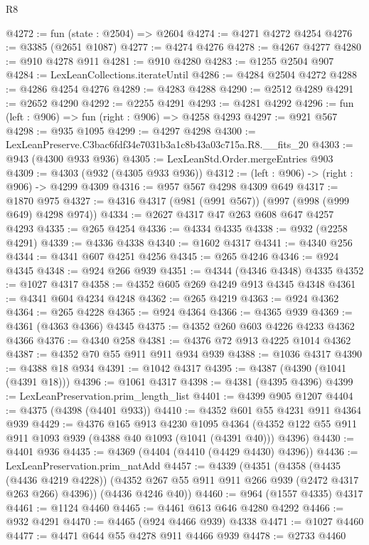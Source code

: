 \begin{lexlean}{R8}
\begin{coremodule}
@4272 := fun (state : @2504) => @2604
@4274 := @4271 @4272 @4254
@4276 := @3385 (@2651 @1087)
@4277 := @4274 @4276
@4278 := @4267 @4277
@4280 := @910 @4278 @911
@4281 := @910 @4280
@4283 := @1255 @2504 @907
@4284 := LexLeanCollections.iterateUntil
@4286 := @4284 @2504 @4272
@4288 := @4286 @4254 @4276
@4289 := @4283 @4288
@4290 := @2512 @4289
@4291 := @2652 @4290
@4292 := @2255 @4291
@4293 := @4281 @4292
@4296 := fun (left : @906) => fun (right : @906) => @4258 @4293
@4297 := @921 @567
@4298 := @935 @1095
@4299 := @4297 @4298
@4300 := LexLeanPreserve.C3bac6fdf34e7031b3a1c8b43a03c715a.R8.__fits_20
@4303 := @943 (@4300 @933 @936)
@4305 := LexLeanStd.Order.mergeEntries @903
@4309 := @4303 (@932 (@4305 @933 @936))
@4312 := (left : @906) -> (right : @906) -> @4299 @4309
@4316 := @957 @567 @4298 @4309 @649
@4317 := @1870 @975
@4327 := @4316 @4317 (@981 (@991 @567)) (@997 (@998 (@999 @649) @4298 @974))
@4334 := @2627 @4317 @47 @263 @608 @647 @4257 @4293
@4335 := @265 @4254
@4336 := @4334 @4335
@4338 := @932 (@2258 @4291)
@4339 := @4336 @4338
@4340 := @1602 @4317
@4341 := @4340 @256
@4344 := @4341 @607 @4251 @4256
@4345 := @265 @4246
@4346 := @924 @4345
@4348 := @924 @266 @939
@4351 := @4344 (@4346 @4348) @4335
@4352 := @1027 @4317
@4358 := @4352 @605 @269 @4249 @913 @4345 @4348
@4361 := @4341 @604 @4234 @4248
@4362 := @265 @4219
@4363 := @924 @4362
@4364 := @265 @4228
@4365 := @924 @4364
@4366 := @4365 @939
@4369 := @4361 (@4363 @4366) @4345
@4375 := @4352 @260 @603 @4226 @4233 @4362 @4366
@4376 := @4340 @258
@4381 := @4376 @72 @913 @4225 @1014 @4362
@4387 := @4352 @70 @55 @911 @911 @934 @939
@4388 := @1036 @4317
@4390 := @4388 @18 @934
@4391 := @1042 @4317
@4395 := @4387 (@4390 (@1041 (@4391 @18)))
@4396 := @1061 @4317
@4398 := @4381 (@4395 @4396)
@4399 := LexLeanPreservation.prim_length_list
@4401 := @4399 @905 @1207
@4404 := @4375 (@4398 (@4401 @933))
@4410 := @4352 @601 @55 @4231 @911 @4364 @939
@4429 := @4376
    @165
    @913
    @4230
    @1095
    @4364
    (@4352 @122 @55 @911 @911 @1093 @939 (@4388 @40 @1093 (@1041 (@4391 @40))) @4396)
@4430 := @4401 @936
@4435 := @4369 (@4404 (@4410 (@4429 @4430) @4396))
@4436 := LexLeanPreservation.prim_natAdd
@4457 := @4339
    (@4351
      (@4358
        (@4435 (@4436 @4219 @4228))
        (@4352 @267 @55 @911 @911 @266 @939 (@2472 @4317 @263 @266) @4396))
      (@4436 @4246 @40))
@4460 := @964 (@1557 @4335) @4317
@4461 := @1124 @4460
@4465 := @4461 @613 @646 @4280 @4292
@4466 := @932 @4291
@4470 := @4465 (@924 @4466 @939) @4338
@4471 := @1027 @4460
@4477 := @4471 @644 @55 @4278 @911 @4466 @939
@4478 := @2733 @4460

\end{coremodule}
\end{lexlean}
